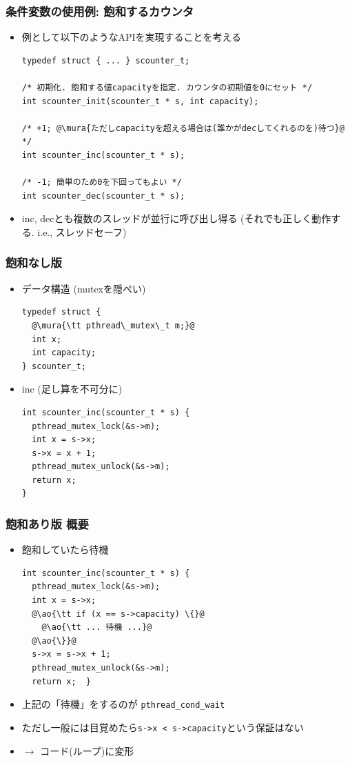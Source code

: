 \documentclass[12pt,dvipdfmx]{beamer}
\begin{document}
\begin{frame}[fragile]
  \frametitle{条件変数の使用例: 飽和するカウンタ}
  \begin{itemize}
  \item 例として以下のようなAPIを実現することを考える
\begin{lstlisting}
typedef struct { ... } scounter_t;

/* 初期化. 飽和する値capacityを指定. カウンタの初期値を0にセット */
int scounter_init(scounter_t * s, int capacity);

/* +1; @\mura{ただしcapacityを超える場合は(誰かがdecしてくれるのを)待つ}@ */
int scounter_inc(scounter_t * s);

/* -1; 簡単のため0を下回ってもよい */
int scounter_dec(scounter_t * s);
\end{lstlisting}
\item inc, decとも複数のスレッドが並行に呼び出し得る
  (それでも正しく動作する. i.e., スレッドセーフ)
\end{itemize}
\end{frame}

\begin{frame}[fragile]
  \frametitle{飽和なし版}
  \begin{itemize}
  \item データ構造 (mutexを隠ぺい)
\begin{lstlisting}
typedef struct {
  @\mura{\tt pthread\_mutex\_t m;}@
  int x;
  int capacity;
} scounter_t;
\end{lstlisting}
  \item inc (足し算を不可分に)
\begin{lstlisting}
int scounter_inc(scounter_t * s) {
  pthread_mutex_lock(&s->m);
  int x = s->x;
  s->x = x + 1;
  pthread_mutex_unlock(&s->m);
  return x;
}
\end{lstlisting}
\end{itemize}
\end{frame}

\begin{frame}[fragile]
  \frametitle{飽和あり版 概要}
  \begin{itemize}
  \item 飽和していたら待機
\begin{lstlisting}
int scounter_inc(scounter_t * s) {
  pthread_mutex_lock(&s->m);
  int x = s->x;
  @\ao{\tt if (x == s->capacity) \{}@
    @\ao{\tt ... 待機 ...}@
  @\ao{\}}@
  s->x = s->x + 1;
  pthread_mutex_unlock(&s->m);
  return x;  }
\end{lstlisting}
\item 上記の「待機」をするのが {\tt pthread\_cond\_wait}
\item ただし一般には目覚めたら{\tt s->x < s->capacity}という保証はない
\item $\rightarrow$ コード(ループ)に変形
  \end{itemize}
\end{frame}
\end{document}
